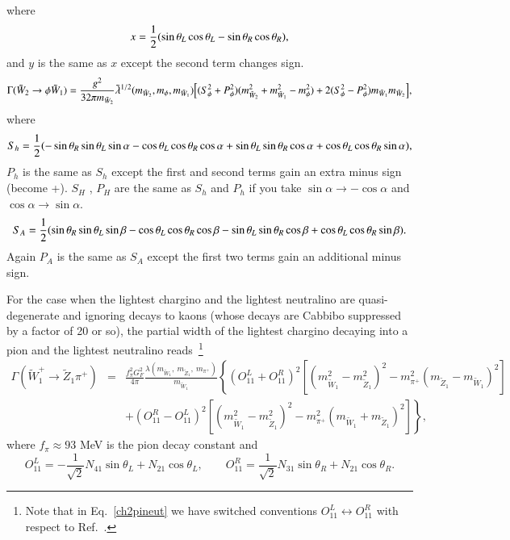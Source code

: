 \documentclass[final,3p,times]{elsarticle}
\begin{document}
where
\begin{equation}
x = {1 \over 2}(\sin \theta_L \cos \theta_L - \sin \theta_R \cos \theta_R),
\end{equation}
and $y$ is the same as $x$ except the second term changes sign.
\begin{equation}\label{ch2phich1}
\Gamma (\tilde{W}_2 \rightarrow \phi \tilde{W}_1) = {g^2 \over 32\pi m_{\tilde{W}_2} } \tilde{\lambda}^{1/2} (m_{\tilde{W}_2}, m_{\phi}, m_{\tilde{W}_1}) \Big[(S_{\phi}^2 + P_{\phi}^2) (m_{\tilde{W}_{2}}^2  + m_{\tilde{W}_{1}}^2 - m_{\phi}^2)  + 2(S_{\phi}^2 -P_{\phi}^2)m_{\tilde{W}_{1}}m_{\tilde{W}_{2}}\Big],
\end{equation} 
where
\begin{equation}
S_h = {1 \over 2} (-\sin \theta_R \sin \theta_L \sin \alpha - \cos \theta_L \cos \theta_R \cos \alpha + \sin \theta_L \sin \theta_R \cos \alpha + \cos \theta_L \cos \theta_R \sin \alpha )  ,
\end{equation}
$P_h$ is the same as $S_h$ except the first and second terms gain an extra minus sign (become +).
$S_H$ , $P_H$ are the same as $S_h$ and $P_h$ if you take $\sin\alpha \rightarrow -\cos\alpha$ and $\cos\alpha \rightarrow \sin\alpha$.
\begin{equation}
S_A = {1 \over 2} (\sin \theta_R \sin \theta_L \sin \beta - \cos \theta_L \cos \theta_R \cos \beta - \sin \theta_L \sin \theta_R \cos \beta + \cos \theta_L \cos \theta_R \sin \beta ).
\end{equation}
Again $P_A$ is the same as $S_A$ except the first two terms gain an additional
minus sign.


For the case when the lightest chargino and the lightest neutralino 
are quasi-degenerate and ignoring decays to
kaons (whose decays are Cabbibo suppressed 
by a factor of 20 or so), the partial width of the lightest chargino decaying
into a pion and the lightest
neutralino reads~\cite{gunionetal}\footnote{Note that  in Eq.~\ref{ch2pineut}
we have switched conventions $O^{L}_{11}\leftrightarrow O^R_{11}$ with respect
to Ref.~\cite{gunionetal}.}
\begin{eqnarray}
\Gamma( {\tilde W}_1^+ \rightarrow {\tilde Z}_1 \pi^+) &=& 
\frac{f_\pi^2 G_F^2}{4 \pi} \frac{\lambda(m_{{\tilde W}_1},\ m_{{\tilde
      Z}_1},\ m_{\pi^+})}{m_{{\tilde W}_1}}
\left\{ (O^L_{11} +O^R_{11})^2 \left[ (m_{{\tilde W}_1}^2 - m_{{\tilde
                                                           Z}_1}^2)^2 - 
m_{\pi^+}^2(m_{{\tilde Z}_1} - m_{{\tilde W}_1})^2 \right] \right. \nonumber \\
&&\left.  + (O^R_{11} - O^L_{11})^2 \left[ (m_{{\tilde W}_1}^2 - m_{{\tilde Z}_1}^2)^2 - m_{\pi^+}^2 (m_{{\tilde W}_1}
  + m_{{\tilde Z}_1})^2\right]
\right\}, \label{ch2pineut}
\end{eqnarray}
where $f_\pi \approx 93$ MeV is the pion decay constant and
\begin{equation}O^L_{11}=- \frac{1}{\sqrt{2}} N_{41} \sin \theta_L + 
N_{21} \cos \theta_L, \qquad
O^R_{11}=\frac{1}{\sqrt{2}} N_{31} \sin \theta_R + 
N_{21} \cos \theta_R. \label{theBigO}\end{equation}
\end{document}
